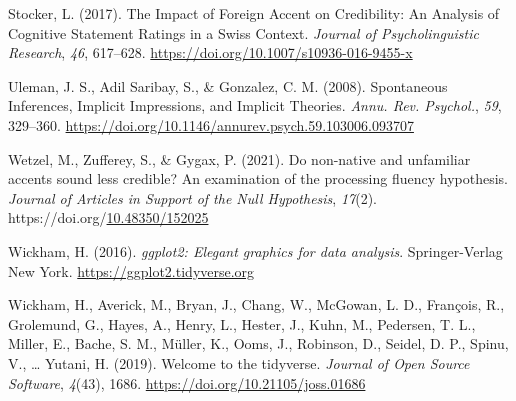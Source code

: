 \documentclass[
  man,floatsintext]{apa7}
\newlength{\cslhangindent}
\newlength{\cslentryspacingunit} %
\newenvironment{CSLReferences}[2] %
 {%
  \setlength{\parindent}{0pt}
  \ifodd #1
  \let\oldpar\par
  \def\par{\hangindent=\cslhangindent\oldpar}
  \fi
  \setlength{\parskip}{#2\cslentryspacingunit}
 }%
 {}
\begin{document}
\begin{CSLReferences}{1}{0}
\leavevmode{}%
Stocker, L. (2017). The {I}mpact of {F}oreign {A}ccent on {C}redibility: {A}n {A}nalysis of {C}ognitive {S}tatement {R}atings in a {S}wiss {C}ontext. \emph{Journal of Psycholinguistic Research}, \emph{46}, 617--628. \url{https://doi.org/10.1007/s10936-016-9455-x}

\leavevmode{}%
Uleman, J. S., Adil Saribay, S., \& Gonzalez, C. M. (2008). Spontaneous {I}nferences, {I}mplicit {I}mpressions, and {I}mplicit {T}heories. \emph{Annu. Rev. Psychol.}, \emph{59}, 329--360. \url{https://doi.org/10.1146/annurev.psych.59.103006.093707}

\leavevmode{}%
Wetzel, M., Zufferey, S., \& Gygax, P. (2021). Do non-native and unfamiliar accents sound less credible? An examination of the processing fluency hypothesis. \emph{Journal of Articles in Support of the Null Hypothesis}, \emph{17}(2). https://doi.org/\href{https://doi.org/\%0910.48350/152025}{10.48350/152025}

\leavevmode{}%
Wickham, H. (2016). \emph{ggplot2: Elegant graphics for data analysis}. Springer-Verlag New York. \url{https://ggplot2.tidyverse.org}

\leavevmode{}%
Wickham, H., Averick, M., Bryan, J., Chang, W., McGowan, L. D., François, R., Grolemund, G., Hayes, A., Henry, L., Hester, J., Kuhn, M., Pedersen, T. L., Miller, E., Bache, S. M., Müller, K., Ooms, J., Robinson, D., Seidel, D. P., Spinu, V., \ldots{} Yutani, H. (2019). Welcome to the {tidyverse}. \emph{Journal of Open Source Software}, \emph{4}(43), 1686. \url{https://doi.org/10.21105/joss.01686}

\end{CSLReferences}


\clearpage
\renewcommand{\listfigurename}{Figure captions}

\clearpage
\renewcommand{\listtablename}{Table captions}
\end{document}
